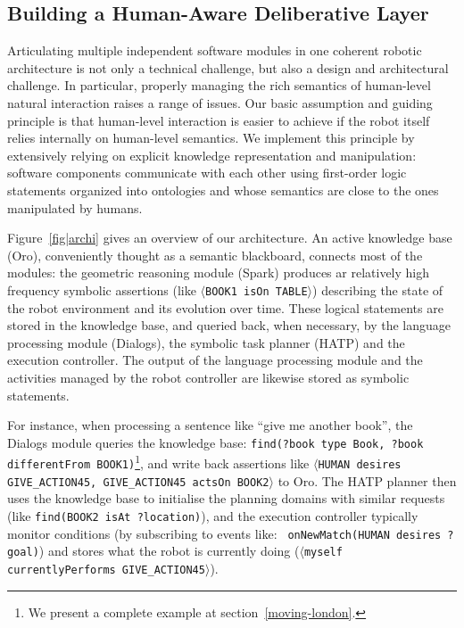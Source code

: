 \documentclass[preprint,3p,times]{elsarticle}
\newcommand{\stmt}[1]{{\footnotesize\tt$\langle$#1\relax$\rangle$}}
\begin{document}
\subsection{Building a Human-Aware Deliberative Layer}

Articulating multiple independent software modules in one coherent robotic
architecture is not only a technical challenge, but also a design and
architectural challenge. In particular, properly managing the rich semantics of
human-level natural interaction raises a range of issues. Our basic assumption
and guiding principle is that human-level interaction is easier to achieve if
the robot itself relies internally on human-level semantics.  We implement this
principle by extensively relying on explicit knowledge representation and
manipulation: software components communicate with each other using first-order
logic statements organized into ontologies and whose semantics are close to the
ones manipulated by humans.

Figure~\ref{fig|archi} gives an overview of our architecture. An active
knowledge base ({\sc Oro}), conveniently thought as a semantic
blackboard, connects most of the modules: the geometric
reasoning module ({\sc Spark}) produces ar relatively high frequency symbolic assertions (like
\stmt{BOOK1 isOn TABLE}) describing the state of the robot environment and its evolution over time. 
These logical statements are stored in the knowledge base, and
queried back, when necessary, by the language processing module ({\sc Dialogs}), the symbolic task
planner (HATP) and the execution controller. The output of the language
processing module and the activities managed by the robot controller are
likewise stored as symbolic statements.

For instance, when processing a sentence like ``give me another book'', the {\sc
Dialogs} module queries the knowledge base: {\tt \footnotesize find(?book type
Book, ?book differentFrom BOOK1)}\footnote{We present a complete
example at section~\ref{moving-london}.}, and write back assertions like
\stmt{HUMAN desires GIVE\_ACTION45, GIVE\_ACTION45 actsOn BOOK2} to {\sc
Oro}. The HATP planner then uses the knowledge base to initialise the
planning domains with similar requests (like {\tt \footnotesize find(BOOK2 isAt
?location)}), and the execution controller typically monitor
conditions (by subscribing to events like: {\tt \footnotesize
onNewMatch(HUMAN desires ?goal)}) and stores what the robot is currently
doing (\stmt{myself currentlyPerforms GIVE\_ACTION45}).
\end{document}
